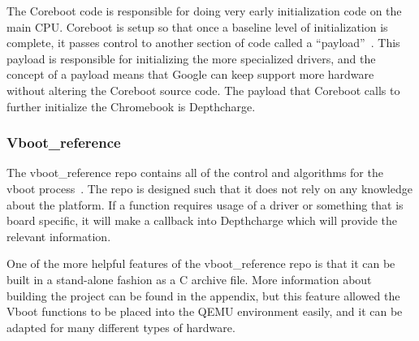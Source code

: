 \documentclass[../report.tex]{subfiles}
\begin{document}
The Coreboot code is responsible for doing very early initialization code on the main CPU\@. 
Coreboot is setup so that once a baseline level of initialization is complete, it passes control to another section of code called a ``payload''~\cite{coreboot-payload}.
This payload is responsible for initializing the more specialized drivers, and the concept of a payload means that Google can keep support more hardware without altering the Coreboot source code.
The payload that Coreboot calls to further initialize the Chromebook is Depthcharge.

% 
% 

\subsubsection{Vboot\_reference}

The vboot\_reference repo contains all of the control and algorithms for the vboot process~\cite{vboot-codebase}.
The repo is designed such that it does not rely on any knowledge about the platform.
If a function requires usage of a driver or something that is board specific, it will make a callback into Depthcharge which will provide the relevant information.

One of the more helpful features of the vboot\_reference repo is that it can be
built in a stand-alone fashion as a C archive file.
More information about building the project can be found in the appendix, but
this feature allowed the Vboot functions to be placed into the QEMU environment
easily, and it can be adapted for many different types of hardware.
\end{document}
